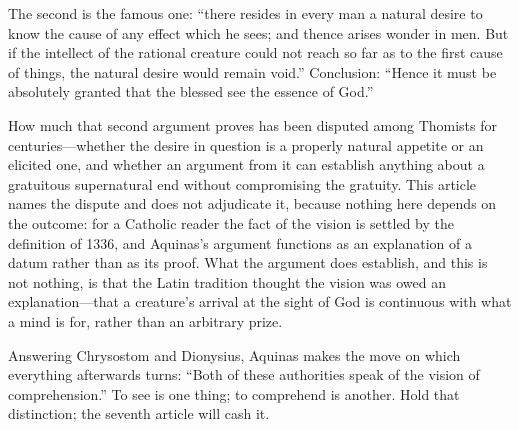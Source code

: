 The second is the famous one: ``there resides in every man a natural desire to know the cause of any effect which he sees; and thence arises wonder in men. But if the intellect of the rational creature could not reach so far as to the first cause of things, the natural desire would remain void.'' Conclusion: ``Hence it must be absolutely granted that the blessed see the essence of God.''

How much that second argument proves has been disputed among Thomists for centuries---whether the desire in question is a properly natural appetite or an elicited one, and whether an argument from it can establish anything about a gratuitous supernatural end without compromising the gratuity. This article names the dispute and does not adjudicate it, because nothing here depends on the outcome: for a Catholic reader the fact of the vision is settled by the definition of 1336, and Aquinas's argument functions as an explanation of a datum rather than as its proof. What the argument does establish, and this is not nothing, is that the Latin tradition thought the vision was owed an explanation---that a creature's arrival at the sight of God is continuous with what a mind is for, rather than an arbitrary prize.

Answering Chrysostom and Dionysius, Aquinas makes the move on which everything afterwards turns: ``Both of these authorities speak of the vision of comprehension.'' To see is one thing; to comprehend is another. Hold that distinction; the seventh article will cash it.

